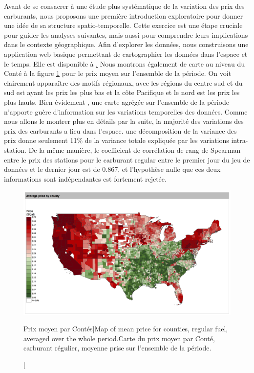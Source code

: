 {Avant de se consacrer à une étude plus systématique de la variation des prix des carburants, nous proposons une première introduction exploratoire pour donner une idée de sa structure spatio-temporelle. Cette exercice est une étape cruciale pour guider les analyses suivantes, mais aussi pour comprendre leurs implications dans le contexte géographique. Afin d'explorer les données, nous construisons une application web basique permettant de cartographier les données dans l'espace et le temps. Elle est disponible à \href{http://shiny.parisgeo.cnrs.fr/fuelprice/}. Nous montrons également de carte au niveau du Conté à la figure \ref{fig:map_price} pour le prix moyen sur l'ensemble de la période. On voit clairement apparaître des motifs régionaux, avec les régions du centre sud et du sud est ayant les prix les plus bas et la côte Pacifique et le nord est les prix les plus hauts. Bien évidement , une carte agrégée sur l'ensemble de la période n'apporte guère d'information sur les variations temporelles des données. Comme nous allons le montrer plus en détails par la suite, la majorité des variations des prix des carburants a lieu dans l'espace. une décomposition de la variance des prix donne seulement 11\% de la variance totale expliquée par les variations intra-station. De la même manière, le coefficient de corrélation de rang de Spearman entre le prix des stations pour le carburant regular entre le premier jour du jeu de données et le dernier jour est de 0.867, et l'hypothèse nulle que ces deux informations sont indépendantes est fortement rejetée.
}


\begin{figure}
\centering
\includegraphics[width=\textwidth]{Figures/EnergyPrice/average_regular_map}
\caption[Mean price for counties][Prix moyen par Contés]{Map of mean price for counties, regular fuel, averaged over the whole period.}{Carte du prix moyen par Conté, carburant régulier, moyenne prise sur l'ensemble de la période.}\vspace{-0.3cm}
\label{fig:map_price}
\end{figure}

